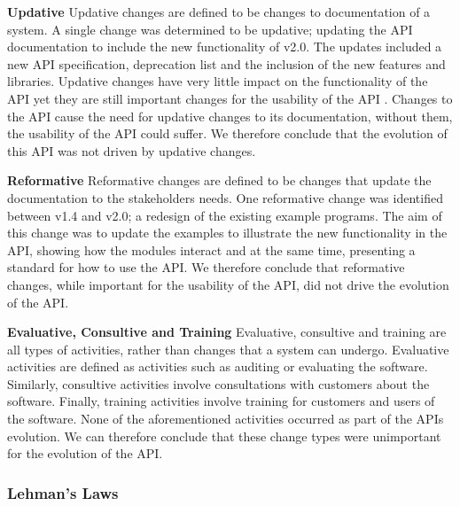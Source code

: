 \documentclass{sig-alternate}
\begin{document}
\smallskip \noindent
\textbf{Updative  }
Updative changes are defined to be changes to documentation of a system.
A single change was determined to be updative; updating the API documentation to include the new functionality of v2.0. The updates included a new API specification, deprecation list and the inclusion of the new features and libraries.
Updative changes have very little impact on the functionality of the API yet they are still important changes for the usability of the API \cite{shi2011empirical}. Changes to the API cause the need for updative changes to its documentation, without them, the usability of the API could suffer. We therefore conclude that the evolution of this API was not driven by updative changes.

\smallskip \noindent
\textbf{Reformative  }
Reformative changes are defined to be changes that update the documentation to the stakeholders needs.
One reformative change was identified between v1.4 and v2.0; a redesign of the existing example programs. The aim of this change was to update the examples to illustrate the new functionality in the API, showing how the modules interact and at the same time, presenting a standard for how to use the API.
We therefore conclude that reformative changes, while important for the usability of the API, did not drive the evolution of the API.

\newpage

\smallskip \noindent
\textbf{Evaluative, Consultive and Training  }
Evaluative, consultive and training are all types of activities, rather than changes that a system can undergo. Evaluative activities are defined as activities such as auditing or evaluating the software. Similarly, consultive activities involve consultations with customers about the software. Finally, training activities involve training for customers and users of the software.
None of the aforementioned activities occurred as part of the APIs evolution.
We can therefore conclude that these change types were unimportant for the evolution of the API.


\subsubsection{Lehman's Laws} 
\end{document}
